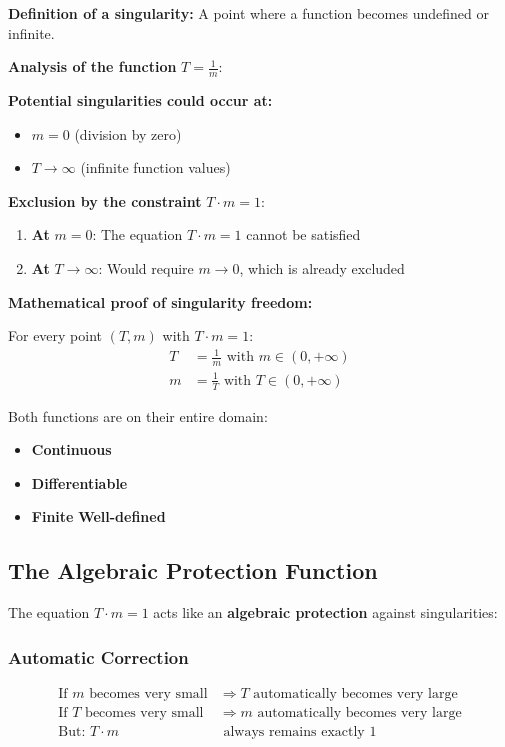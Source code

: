 \documentclass[12pt,a4paper]{article}
\theoremstyle{definition}
\theoremstyle{remark}
\begin{document}
	\textbf{Definition of a singularity:} A point where a function becomes undefined or infinite.
	
	\textbf{Analysis of the function} $T = \frac{1}{m}$:
	
	\textbf{Potential singularities could occur at:}
	\begin{itemize}
		\item $m = 0$ (division by zero)
		\item $T \to \infty$ (infinite function values)
	\end{itemize}
	
	\textbf{Exclusion by the constraint} $T \cdot m = 1$:
	\begin{enumerate}
		\item \textbf{At} $m = 0$: The equation $T \cdot m = 1$ cannot be satisfied
		\item \textbf{At} $T \to \infty$: Would require $m \to 0$, which is already excluded
	\end{enumerate}
	
	\textbf{Mathematical proof of singularity freedom:}
	
	For every point $(T,m)$ with $T \cdot m = 1$:
	\begin{align}
		T &= \frac{1}{m} \text{ with } m \in (0, +\infty)\\
		m &= \frac{1}{T} \text{ with } T \in (0, +\infty)
	\end{align}
	
	Both functions are on their entire domain:
	\begin{itemize}
		\item \textbf{Continuous}
		\item \textbf{Differentiable}
		\item \textbf{Finite}
		\textbf{Well-defined}
	\end{itemize}
	
	\subsection{The Algebraic Protection Function}
	
	The equation $T \cdot m = 1$ acts like an \textbf{algebraic protection} against singularities:
	
	\subsubsection{Automatic Correction}
	\begin{align}
		\text{If } m \text{ becomes very small} &\Rightarrow T \text{ automatically becomes very large}\\
		\text{If } T \text{ becomes very small} &\Rightarrow m \text{ automatically becomes very large}\\
		\text{But: } T \cdot m &\text{ always remains exactly } 1
	\end{align}
	
\end{document}
